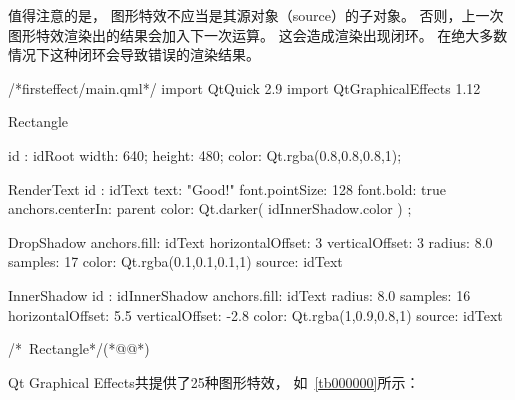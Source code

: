 值得注意的是，
图形特效不应当是其源对象（source）的子对象。
否则，上一次图形特效渲染出的结果会加入下一次运算。
这会造成渲染出现闭环。
在绝大多数情况下这种闭环会导致错误的渲染结果。

\label{f000051}    %
\FloatBarrier                                  %
\begin{thebookfilesourceone}[escapeinside={(*@}{@*)},
caption=GoodLuck,
title=\filesourcenumbernameone \thefilesourcenumber
]
/*firsteffect/main.qml*/
import QtQuick 2.9
import QtGraphicalEffects 1.12

Rectangle {

    id : idRoot
    width: 640;
    height: 480;
    color: Qt.rgba(0.8,0.8,0.8,1);

    RenderText{
        id : idText
        text: "Good!"
        font.pointSize: 128
        font.bold: true
        anchors.centerIn: parent
        color: Qt.darker( idInnerShadow.color ) ;
    }

    DropShadow{
        anchors.fill: idText
        horizontalOffset: 3
        verticalOffset: 3
        radius: 8.0
        samples: 17
        color: Qt.rgba(0.1,0.1,0.1,1)
        source: idText
    }

    InnerShadow{
        id : idInnerShadow
        anchors.fill: idText
        radius: 8.0
        samples: 16
        horizontalOffset: 5.5
        verticalOffset: -2.8
        color: Qt.rgba(1,0.9,0.8,1)
        source: idText
    }

}/*~Rectangle*/(*@\marginpar[\hfill\setlength\fboxsep{2pt}\fbox{\footnotesize{\kaishu\parbox{1em}{\setlength{\baselineskip}{2pt}\filesourcenumbernameone}}\footnotesize{\thefilesourcenumber}}]{\setlength\fboxsep{2pt}\fbox{\footnotesize{\kaishu\parbox{1em}{\setlength{\baselineskip}{2pt}\filesourcenumbernameone}}\footnotesize{\thefilesourcenumber}}}@*)\end{thebookfilesourceone}          %
\addtocounter{lstlisting}{-1}   %


Qt Graphical Effects共提供了25种图形特效，
如\tablename\ \ref{tb000000}所示：















